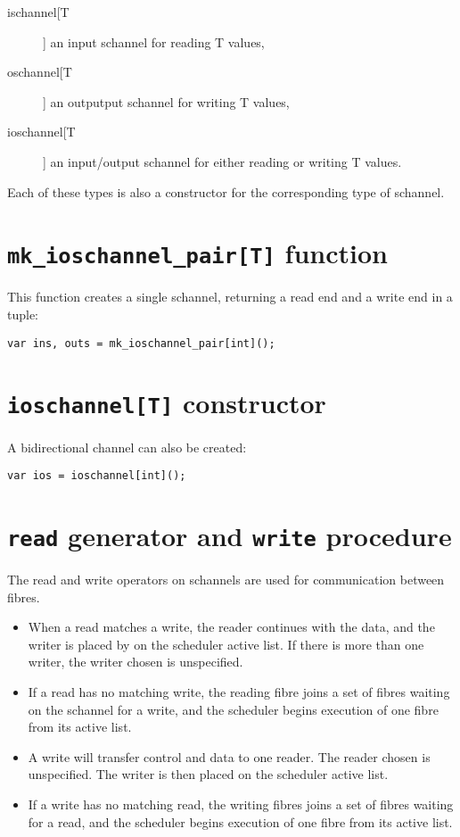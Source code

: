 \documentclass[oneside]{book}
\begin{document}
\begin{description}
\item[ischannel[T]] an input schannel for reading T values,
\item[oschannel[T]] an outputput schannel for writing T values,
\item[ioschannel[T]] an input/output schannel for either reading or writing T values.
\end{description}

Each of these types is also a constructor for the corresponding
type of schannel.

\section{{\tt mk\_ioschannel\_pair[T]} function}
This function creates a single schannel, returning a read end
and a write end in a tuple:

\begin{verbatim}
var ins, outs = mk_ioschannel_pair[int]();
\end{verbatim}

\section{{\tt ioschannel[T]} constructor}
A bidirectional channel can also be created:

\begin{verbatim}
var ios = ioschannel[int]();
\end{verbatim}


\section{{\tt read} generator and {\tt write} procedure}
The read and write operators on schannels are used for 
communication between fibres. 

\begin{itemize}
\item
When a read matches a write,
the reader continues with the data, and the writer is
placed by on the scheduler active list. If there is
more than one writer, the writer chosen is unspecified.

\item If a read has no matching write, the reading fibre joins
a set of fibres waiting on the schannel for a write,
and the scheduler begins execution of one fibre from
its active list.

\item A write will transfer control and data to one reader.
The reader chosen is unspecified. The writer is then
placed on the scheduler active list.

\item If a write has no matching read, the writing fibres joins
a set of fibres waiting for a read, and the scheduler
begins execution of one fibre from its active list.
\end{itemize}
\end{document}
